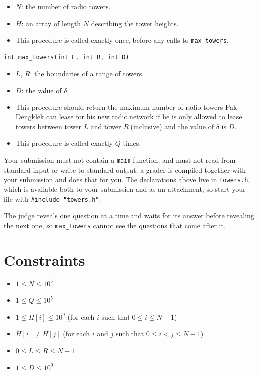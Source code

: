\begin{itemize}
  \item $N$: the number of radio towers.
  \item $H$: an array of length $N$ describing the tower heights.
  \item This procedure is called exactly once, before any calls to \texttt{max\_towers}.
\end{itemize}

\begin{verbatim}
int max_towers(int L, int R, int D)
\end{verbatim}

\begin{itemize}
  \item $L$, $R$: the boundaries of a range of towers.
  \item $D$: the value of $\delta$.
  \item This procedure should return the maximum number of radio towers Pak Dengklek can lease for
  his new radio network if he is only allowed to lease towers between tower $L$ and tower $R$
  (inclusive) and the value of $\delta$ is $D$.
  \item This procedure is called exactly $Q$ times.
\end{itemize}

Your submission must not contain a \texttt{main} function, and must not read from standard input or
write to standard output: a grader is compiled together with your submission and does that for you.
The declarations above live in \texttt{towers.h}, which is available both to your submission and as
an attachment, so start your file with \texttt{\#include "towers.h"}.

The judge reveals one question at a time and waits for its answer before revealing the next one, so
\texttt{max\_towers} cannot see the questions that come after it.

\section*{Constraints}
\begin{itemize}
  \item $1 \leq N \leq 10^5$
  \item $1 \leq Q \leq 10^5$
  \item $1 \leq H[i] \leq 10^9$ (for each $i$ such that $0 \leq i \leq N-1$)
  \item $H[i] \neq H[j]$ (for each $i$ and $j$ such that $0 \leq i < j \leq N-1$)
  \item $0 \leq L \leq R \leq N-1$
  \item $1 \leq D \leq 10^9$
\end{itemize}

